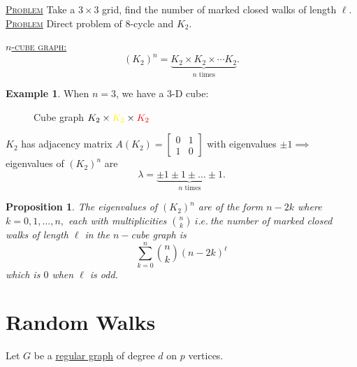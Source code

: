 \documentclass{report}
\newcommand{\ie}{\ i.e.\ }
\newcommand{\fancyem}[1]{\underline{\textsc{#1}}}
\newtheorem{proposition}{Proposition}[section]
\theoremstyle{definition}
\newtheorem{example}{Example}[section]
\theoremstyle{remark}
\numberwithin{equation}{section}
\begin{document}
\fancyem{Problem}
Take a $3 \times 3$ grid, find the number of marked closed walks of length $\ell.$\\
\fancyem{Problem}
Direct problem of $8$-cycle and $K_2.$



\fancyem{$n$-cube graph:}
\[(K_2)^n = \underbrace{K_2 \times K_2 \times \cdots K_2}_\text{$n$ times}.\]

\begin{example}
When $n = 3$, we have a $3$-D cube:
\begin{figure}[h]
\centering
{}
\label{fig:cube}
\caption{Cube graph $K_2 \times \color{yellow} K_2 \color{black} \times \color{red} K_2$ }
\end{figure}
\end{example}

$K_2$ has adjacency matrix $A(K_2) = \begin{bmatrix}
0 & 1 \\ 1 & 0
\end{bmatrix}$ with eigenvalues $\pm 1 \implies$ eigenvalues of $(K_2)^n$ are
\[
\lambda = \underbrace{\pm 1 \pm 1 \pm \ldots \pm 1}_\text{$n$ times}.
\]

\begin{proposition}
The eigenvalues of $(K_2)^n$ are of the form $n - 2k$ where $k = 0, 1, \ldots, n,$ each with multiplicities $\binom{n}{k} \ie$the number of marked closed walks of length $\ell$ in the $n-$cube graph is
\[\sum_{k = 0}^n \binom{n}{k} (n - 2k)^\ell\]
which is $0$ when $\ell$ is odd.
\end{proposition}

\section{Random Walks}
Let $G$ be a \underline{regular graph} of degree $d$ on $p$ vertices.
\end{document}
